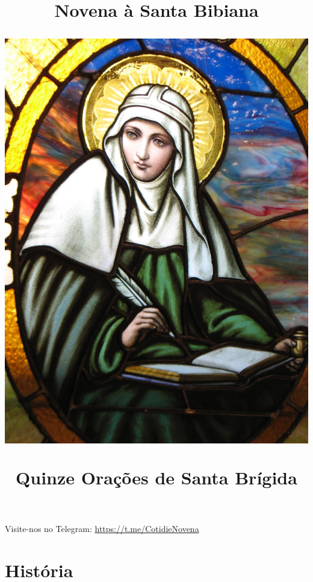 \documentclass[11pt]{article}
\title{Novena à Santa Bibiana}
\title{
  \includegraphics[scale=0.28]{./assets/imagem.jpg}
  \par
   Quinze Orações de Santa Brígida}
\author{}
\date{}
\begin{document}
\maketitle

\thispagestyle{empty}

\pagestyle{fancy}
\fancyhf{} %

\fancyfoot[R]{\thepage}
  
\newpage

\tableofcontents

\centering
\vfill
Visite-nos no Telegram: \url{https://t.me/CotidieNovena}
\newpage


\section{História}
\end{document}
